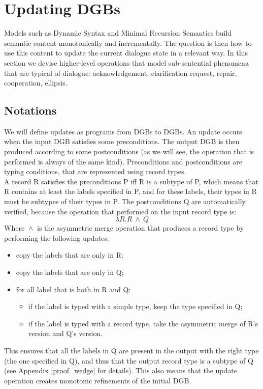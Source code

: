 \documentclass[11pt]{article}
\begin{document}
	\section{Updating DGBs} \label{conversational_rules}
		Models such as Dynamic Syntax and Minimal Recursion Semantics build semantic content monotonically and incrementally. The question is then how to use this content to update the current dialogue state in a relevant way. In this section we devise higher-level operations that model sub-sentential phenomena that are typical of dialogue: acknowledgement, clarification request, repair, cooperation, ellipsis.
		\subsection{Notations}
			We will define updates as programs from DGBs to DGBs. An update occurs when the input DGB satisfies some preconditions. The output DGB is then produced according to some postconditions (as we will see, the operation that is performed is always of the same kind). Preconditions and postconditions are typing conditions, that are represented using record types.\\
			
			A record R satisfies the preconditions P iff R is a subtype of P, which means that R contains at least the labels specified in P, and for these labels, their types in R must be subtypes of their types in P. The postconditions Q are automatically verified, because the operation that performed on the input record type is:
			\begin{equation*}
				\lambda R. R \ \boxed{\wedge} \ Q
			\end{equation*}
			Where $\boxed{\wedge}$ is the asymmetric merge operation that produces a record type by performing the following updates:
			\begin{itemize}
				\item copy the labels that are only in R;
				\item copy the labels that are only in Q;
				\item for all label that is both in R and Q:
				\begin{itemize}
					\item if the label is typed with a simple type, keep the type specified in Q;
					\item if the label is typed with a record type, take the asymmetric merge of R's version and Q's version.
				\end{itemize}
			\end{itemize}
			This ensures that all the labels in Q are present in the output with the right type (the one specified in Q), and thus that the output record type is a subtype of Q (see Appendix \ref{proof_wedge} for details). This also means that the update operation creates monotonic refinements of the initial DGB.
\end{document}
